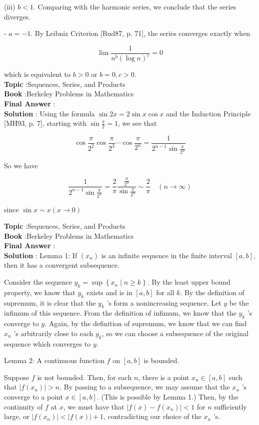 \documentclass[10pt]{article}
\begin{document}
(iii) $b<1$. Comparing with the harmonic series, we conclude that the series diverges.

- $a=-1$. By Leibniz Criterion [Rud87, p. 71], the series converges exactly when

$$
\lim \frac{1}{n^{b}(\log n)^{c}}=0
$$

which is equivalent to $b>0$ or $b=0, c>0$. \\
\textbf{Topic} :Sequences, Series, and Products \\
\textbf{Book} :Berkeley Problems in Mathematics\\
\textbf{Final Answer} :\\


\textbf{Solution} : Using the formula $\sin 2 x=2 \sin x \cos x$ and the Induction Principle [MH93, p. 7], starting with $\sin \frac{\pi}{2}=1$, we see that

$$
\cos \frac{\pi}{2^{2}} \cos \frac{\pi}{2^{3}} \cdots \cos \frac{\pi}{2^{n}}=\frac{1}{2^{n-1} \sin \frac{\pi}{2^{n}}}
$$

So we have

$$
\frac{1}{2^{n-1} \sin \frac{\pi}{2^{n}}}=\frac{2}{\pi} \frac{\frac{\pi}{2^{n}}}{\sin \frac{\pi}{2^{n}}} \sim \frac{2}{\pi} \quad(n \rightarrow \infty)
$$

since $\sin x \sim x(x \rightarrow 0)$


\textbf{Topic} :Sequences, Series, and Products \\
\textbf{Book} :Berkeley Problems in Mathematics\\
\textbf{Final Answer} :\\


\textbf{Solution} : Lemma 1: If $\left(x_{n}\right)$ is an infinite sequence in the finite interval $[a, b]$, then it has a convergent subsequence.

Consider the sequence $y_{k}=\sup \left\{x_{n} \mid n \geqslant k\right\}$. By the least upper bound property, we know that $y_{k}$ exists and is in $[a, b]$ for all $k$. By the definition of supremum, it is clear that the $y_{k}$ 's form a nonincreasing sequence. Let $y$ be the infimum of this sequence. From the definition of infimum, we know that the $y_{k}$ 's converge to $y$. Again, by the definition of supremum, we know that we can find $x_{n}$ 's arbitrarily close to each $y_{k}$, so we can choose a subsequence of the original sequence which converges to $y$.

Lemma 2: A continuous function $f$ on $[a, b]$ is bounded.

Suppose $f$ is not bounded. Then, for each $n$, there is a point $x_{n} \in[a, b]$ such that $\left|f\left(x_{n}\right)\right|>n$. By passing to a subsequence, we may assume that the $x_{n}$ 's converge to a point $x \in[a, b]$. (This is possible by Lemma 1.) Then, by the continuity of $f$ at $x$, we must have that $\left|f(x)-f\left(x_{n}\right)\right|<1$ for $n$ sufficiently large, or $\left|f\left(x_{n}\right)\right|<|f(x)|+1$, contradicting our choice of the $x_{n}$ 's.
\end{document}
